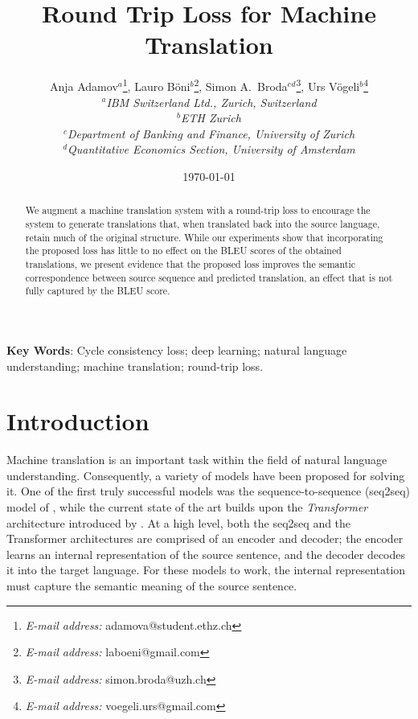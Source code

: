 \documentclass[10pt,a4paper]{article}
\begin{document}
\title{Round Trip Loss for Machine Translation}
\date{\today}
\author{
Anja Adamov$\mbox{}^a$\thanks{\emph{E-mail address:} adamova@student.ethz.ch},
Lauro B\"{o}ni$\mbox{}^b$\thanks{\emph{E-mail address:} laboeni@gmail.com},
Simon A.\ Broda$\mbox{}^c\mbox{}^d$\thanks{\emph{E-mail address:} simon.broda@uzh.ch},
Urs V\"{o}geli$\mbox{}^b$\thanks{\emph{E-mail address:} voegeli.urs@gmail.com}
\medskip \\
\textit{\small $\mbox{}^a$IBM Switzerland Ltd., Zurich, Switzerland}
\medskip \\
\textit{\small $\mbox{}^b$ETH Zurich}
\medskip \\
\textit{\small $\mbox{}^c$Department of Banking and Finance, University of Zurich}
\medskip \\
\textit{\small $\mbox{}^d$Quantitative Economics Section, University of Amsterdam}
}
\maketitle \setcounter{page}{0}\thispagestyle{empty}
\begin{abstract}
We augment a machine translation system with a round-trip loss to encourage the system to generate translations that, when translated back into the source language, retain much of the original structure. While our experiments show that incorporating the proposed loss has little to no effect on the BLEU scores of the obtained translations, we present evidence that the proposed loss improves the semantic correspondence between source sequence and predicted translation, an effect that is not fully captured by the BLEU score. 
\end{abstract}
\bigskip \textbf{Key Words}: Cycle consistency loss; deep learning; natural language understanding; machine translation; round-trip loss.
\newpage
\setcounter{page}{1}
\section{Introduction}
Machine translation is an important task within the field of natural language understanding. Consequently, a variety of models have been proposed for solving it. One of the first truly successful models was the sequence-to-sequence (seq2seq) model of \citet{seq2seq}, while the current state of the art builds upon the \emph{Transformer} architecture introduced by \citet{transformer}. At a high level, both the seq2seq and the Transformer architectures are comprised of an encoder and decoder; the encoder learns an internal representation of the source sentence, and the decoder decodes it into the target language. For these models to work, the internal representation must capture the semantic meaning of the source sentence.
\end{document}
